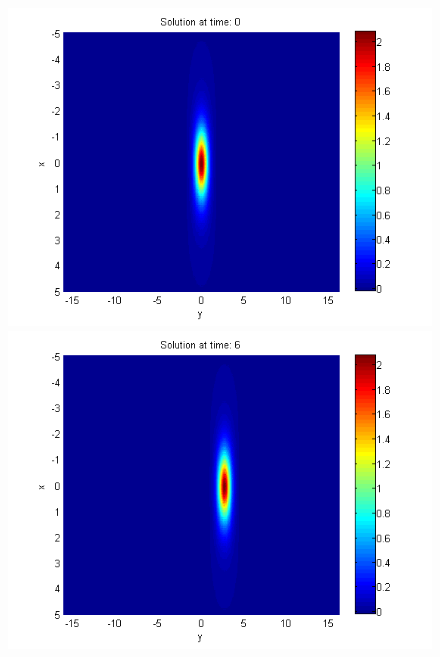 \documentclass{article}
\begin{document}
\begin{figure}[ht]\vspace{0.2cm}
\centering
	\begin{minipage}[b]{0.32\linewidth}
		\includegraphics[width=\linewidth]{../amitans/figures/solution_30x45_bt3_c045_T0.png}
	\end{minipage}	
	\begin{minipage}[b]{0.32\linewidth}
		\includegraphics[width=\linewidth]{../amitans/figures/solution_30x45_bt3_c045_T6.png}
	\end{minipage}	
	\begin{minipage}[b]{0.32\linewidth}

\end{minipage}
\end{figure}
\end{document}
